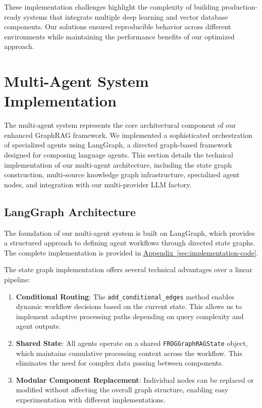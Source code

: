 These implementation challenges highlight the complexity of building production-ready systems that integrate multiple deep learning and vector database components. Our solutions ensured reproducible behavior across different environments while maintaining the performance benefits of our optimized approach.

\section{Multi-Agent System Implementation}
The multi-agent system represents the core architectural component of our enhanced GraphRAG framework. We implemented a sophisticated orchestration of specialized agents using LangGraph, a directed graph-based framework designed for composing language agents. This section details the technical implementation of our multi-agent architecture, including the state graph construction, multi-source knowledge graph infrastructure, specialized agent nodes, and integration with our multi-provider LLM factory.

\subsection{LangGraph Architecture}
The foundation of our multi-agent system is built on LangGraph, which provides a structured approach to defining agent workflows through directed state graphs. The complete implementation is provided in \hyperref[code:state-graph]{Appendix~\ref{sec:implementation-code}}.

The state graph implementation offers several technical advantages over a linear pipeline:

\begin{enumerate}
    \item \textbf{Conditional Routing}: The \texttt{add\_conditional\_edges} method enables dynamic workflow decisions based on the current state. This allows us to implement adaptive processing paths depending on query complexity and agent outputs.
    
    \item \textbf{Shared State}: All agents operate on a shared \texttt{FROGGraphRAGState} object, which maintains cumulative processing context across the workflow. This eliminates the need for complex data passing between components.
    
    \item \textbf{Modular Component Replacement}: Individual nodes can be replaced or modified without affecting the overall graph structure, enabling easy experimentation with different implementations.
\end{enumerate}

